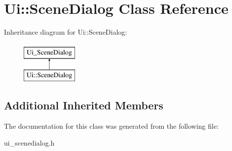 \hypertarget{classUi_1_1SceneDialog}{\section{Ui\-:\-:Scene\-Dialog Class Reference}
\label{classUi_1_1SceneDialog}
}
Inheritance diagram for Ui\-:\-:Scene\-Dialog\-:\begin{figure}[H]
\begin{center}
\leavevmode
\includegraphics[height=2.000000cm]{classUi_1_1SceneDialog}
\end{center}
\end{figure}
\subsection*{Additional Inherited Members}


The documentation for this class was generated from the following file\-:\begin{DoxyCompactItemize}
\item 
ui\-\_\-scenedialog.\-h\end{DoxyCompactItemize}
